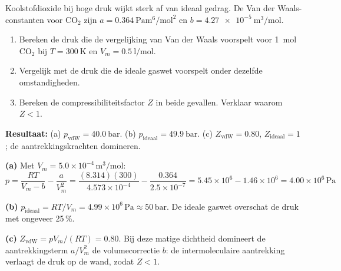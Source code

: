\begin{oefening}
Koolstofdioxide bij hoge druk wijkt sterk af van ideaal gedrag. De Van der Waals-constanten voor $\mathrm{CO_2}$ zijn $a = \SI{0.364}{\pascal\metre\tothe{6}\per\mole\tothe{2}}$ en $b = \SI{4.27e-5}{\metre\cubed\per\mole}$.
\begin{enumerate}
\item[(a)] Bereken de druk die de vergelijking van Van der Waals voorspelt voor \SI{1}{\mole} $\mathrm{CO_2}$ bij $T = \SI{300}{\kelvin}$ en $V_m = \SI{0.5}{\litre\per\mole}$.
\item[(b)] Vergelijk met de druk die de ideale gaswet voorspelt onder dezelfde omstandigheden.
\item[(c)] Bereken de compressibiliteitsfactor $Z$ in beide gevallen. Verklaar waarom $Z < 1$.
\end{enumerate}    
\end{oefening}
\begin{oplossing}
\textbf{Resultaat:} (a) $p_{\text{vdW}} = \SI{40.0}{\bar}$. (b) $p_{\text{ideaal}} = \SI{49.9}{\bar}$. (c) $Z_{\text{vdW}} = 0.80$, $Z_{\text{ideaal}} = 1$; de aantrekkingskrachten domineren.

\textbf{(a)} Met $V_m = 5.0\times10^{-4}\,\mathrm{m^3/mol}$:
\[
p = \frac{RT}{V_m - b} - \frac{a}{V_m^2} = \frac{(8.314)(300)}{4.573\times10^{-4}} - \frac{0.364}{2.5\times10^{-7}} = 5.45\times10^{6} - 1.46\times10^{6} = 4.00\times10^{6}\,\mathrm{Pa}
\]

\textbf{(b)} $p_{\text{ideaal}} = RT/V_m = 4.99\times10^{6}\,\mathrm{Pa} \approx 50\,\mathrm{bar}$. De ideale gaswet overschat de druk met ongeveer 25\,\%.

\textbf{(c)} $Z_{\text{vdW}} = pV_m/(RT) = 0.80$. Bij deze matige dichtheid domineert de aantrekkingsterm $a/V_m^2$ de volumecorrectie $b$: de intermoleculaire aantrekking verlaagt de druk op de wand, zodat $Z < 1$.
\end{oplossing}

